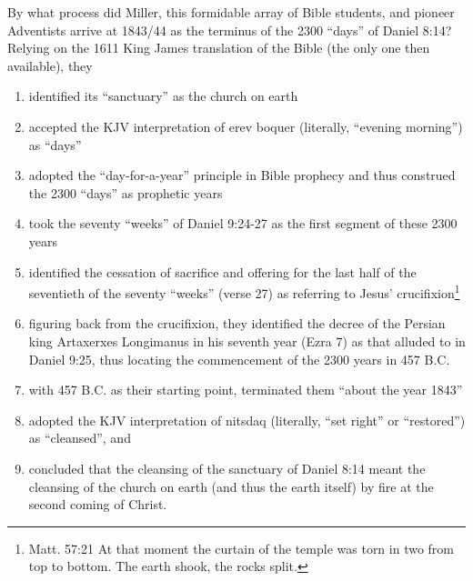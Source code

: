 By what process did Miller, this formidable array of Bible students, and
pioneer Adventists arrive at 1843/44 as the terminus of the 2300 ``days'' of
Daniel 8:14? Relying on the 1611 King James translation of the Bible (the
only one then available), they
\begin{enumerate}
    \item identified its ``sanctuary'' as the church on earth
    \item accepted the KJV interpretation of erev boquer (literally, ``evening
        morning'') as ``days''
    \item adopted the ``day-for-a-year'' principle in Bible prophecy and thus
        construed the 2300 ``days'' as prophetic years
    \item took the seventy ``weeks'' of Daniel 9:24-27 as the first segment of
        these 2300 years
    \item identified the cessation of sacrifice and offering for the last half
        of the seventieth of the seventy ``weeks'' (verse 27) as referring to
        Jesus' crucifixion\footnote{Matt. 57:21 At that moment the curtain of
        the temple was torn in two from top to bottom. The earth shook, the
        rocks split.}
    \item figuring back from the crucifixion, they identified the decree of the
        Persian king Artaxerxes Longimanus in his seventh year (Ezra 7) as that
        alluded to in Daniel 9:25, thus locating the commencement of the 2300
        years in 457 B.C.
    \item with 457 B.C. as their starting point, terminated them ``about the
        year 1843''
    \item adopted the KJV interpretation of nitsdaq (literally, ``set right''
        or ``restored'') as ``cleansed'', and 
    \item concluded that the cleansing of the sanctuary of Daniel 8:14
        meant the cleansing of the church on earth (and thus the earth
        itself) by fire at the second coming of Christ.
\end{enumerate}

